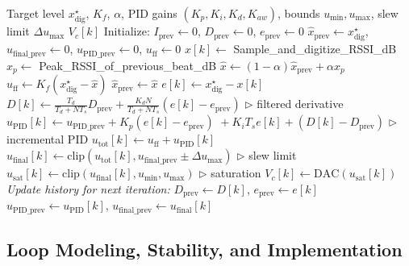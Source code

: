 \documentclass[journal]{IEEEtran}
\begin{document}
\begin{algorithm}[t]
\caption{Beat-Synchronous 2-DOF Gain Stabilization with RSSI Prediction}
\label{alg:pid_control}
\begin{algorithmic}[1]
\setlength{\baselineskip}{1.2\baselineskip}  %
\small  %
\Require Target level $x^\star_{\text{dig}}$, $K_f$, $\alpha$, PID gains $(K_p,K_i,K_d,K_{aw})$, bounds $u_{\min},u_{\max}$, slew limit $\Delta u_{\max}$
\Ensure $V_c[k]$
\State Initialize: $I_{\text{prev}}\gets 0$, $D_{\text{prev}}\gets 0$, $e_{\text{prev}}\gets 0$
\State $\hat x_{\text{prev}}\gets x^\star_{\text{dig}}$, $u_{\text{final\_prev}}\gets 0$, $u_{\text{PID\_prev}}\gets 0$, $u_{\text{ff}}\gets 0$
  \State $x[k]\gets$ Sample\_and\_digitize\_RSSI\_dB
    \State $x_{p}\gets$ Peak\_RSSI\_of\_previous\_beat\_dB
    \State $\hat x \gets (1-\alpha)\hat x_{\text{prev}}+\alpha x_{p}$
    \State $u_{\text{ff}}\gets K_f(x^\star_{\text{dig}}-\hat x)$
    \State $\hat x_{\text{prev}}\gets \hat x$
  \EndIf
  \State $e[k]\gets x^\star_{\text{dig}}-x[k]$
  \State $D[k]\gets \frac{T_d}{T_d+NT_s}D_{\text{prev}}+\frac{K_dN}{T_d+NT_s}(e[k]-e_{\text{prev}})$
  \Statex \hfill $\triangleright$ filtered derivative
  \State $u_{\text{PID}}[k]\gets u_{\text{PID\_prev}}+K_p(e[k]-e_{\text{prev}})$
  \Statex \hspace{3.5em} ${}+K_iT_se[k]+(D[k]-D_{\text{prev}})$
  \Statex \hfill $\triangleright$ incremental PID
  \State $u_{\text{tot}}[k]\gets u_{\text{ff}}+u_{\text{PID}}[k]$
  \State $u_{\text{final}}[k]\gets \text{clip}(u_{\text{tot}}[k], u_{\text{final\_prev}}\pm\Delta u_{\max})$
  \State \hfill $\triangleright$ slew limit
  \State $u_{\text{sat}}[k]\gets \text{clip}(u_{\text{final}}[k], u_{\min}, u_{\max})$
  \State \hfill $\triangleright$ saturation
  \State $V_c[k]\gets \text{DAC}(u_{\text{sat}}[k])$
  \State \textit{Update history for next iteration:}
  \State $D_{\text{prev}}\gets D[k]$, $e_{\text{prev}}\gets e[k]$
  \State $u_{\text{PID\_prev}}\gets u_{\text{PID}}[k]$, $u_{\text{final\_prev}}\gets u_{\text{final}}[k]$
\EndWhile
\end{algorithmic}
\end{algorithm}






\subsection{Loop Modeling, Stability, and Implementation}
\label{subsec:loop_modeling_and_stability}
\end{document}
